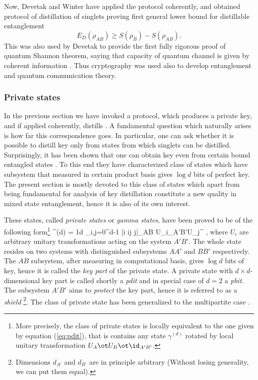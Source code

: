 \documentclass[rmp,12pt,preprint]{revtex4-2}
\begin{document}
Now, Devetak and Winter have applied the protocol coherently, and
obtained protocol of distillation of singlets proving first general
lower bound for distillable entanglement \begin{equation} E_D(\rho_{AB})\geq S(\rho_B)- S(\rho_{AB}). \end{equation}
This was also used by Devetak to provide the first fully rigorous
proof of quantum Shannon theorem, saying that capacity of quantum
channel is given by coherent information \cite{Devetak2003}.
Thus cryptography was used also to develop entanglement and
quantum communication theory.

\subsubsection{Private states}
\label{subsubsec:private} In the previous section we have invoked a
protocol, which produces a private key, and if applied coherently,
distills \singlets. A fundamental question which naturally arises is
how far this correspondence goes. In particular, one can ask whether
it is possible to distill key only from states from which singlets
can be distilled. Surprisingly,  it has been shown that one can
obtain key even from certain bound entangled states
\cite{pptkey,keyhuge}.
To this end they have characterized
class of states which have subsystem that measured in certain
product basis gives $\log d$ bits of perfect key. The present section is mostly devoted to this class of states which apart from being fundamental for analysis of key distillation constitute a new quality in mixed state entanglement, hence it is also of its own interest.

These states, called {\it private states} or {\it gamma states},
have been proved to be of the following form\footnote{
More precisely, the class of private states is locally equivalent to the one
given by equation (\ref{eq:pdit}), that is contains any state $\gamma^{(d)}$ rotated by local unitary transformation $U_A\ot U_B \ot \id_{A'B'}$.} \be \gamma^{(d)} =
{1\over d} \sum_{i,j=0}^{d-1} |i i\>\<j j|_{AB}\ot
U_{i}\rho_{A'B'}U_{j}^{\dagger} \label{eq:pdit}, \ee where $U_i$
are arbitrary unitary transformations acting on the system $A'B'$.
The whole state resides on two systems with distinguished subsystems $A A'$ and $BB'$ respectively. The $AB$ subsystem, after measuring in
computational basis, gives $\log d$ bits of key, hence it is called
the {\it key part} of the private state. A private state with
$d\times d$-dimensional key part is called shortly a {\it pdit} and
in special case of $d=2$ a {\it pbit}. The subsystem $A'B'$ aims to
{\it protect} the key part, hence it is referred to as a {\it
shield} {}\footnote{Dimensions $d_{A'}$ and $d_{B'}$ are in
principle arbitrary (Without losing generality, we can put them
equal).}. The class of private state has been generalized
to the multipartite case \cite{AH-pditdist}.
\end{document}
